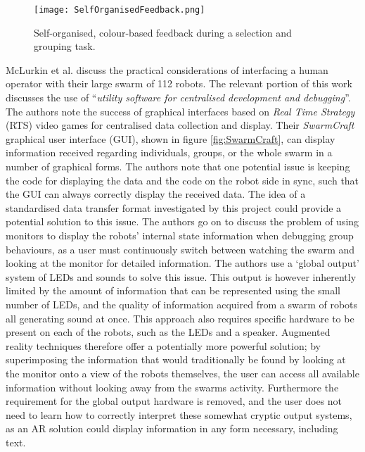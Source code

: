 \begin{figure}
 \begin{center}
 \texttt{[image: SelfOrganisedFeedback.png]}
 \decoRule
 \caption[Self Organised Feedback. \cite{Podevijn:2012}]{Self-organised, colour-based feedback during a selection and grouping task. \cite{Podevijn:2012}}
 \label{fig:SelfOrganisedFeedback}
 \end{center}
\end{figure}

McLurkin et al. \cite{McLurkin:2006} discuss the practical considerations of interfacing a human operator with their large swarm of 112 robots. The relevant portion of this work discusses the use of ``\textit{utility software for centralised development and debugging}''. The authors note the success of graphical interfaces based on \textit{Real Time Strategy} (RTS) video games for centralised data collection and display. Their \textit{SwarmCraft} graphical user interface (GUI), shown in figure \ref{fig:SwarmCraft}, can display information received regarding individuals, groups, or the whole swarm in a number of graphical forms. The authors note that one potential issue is keeping the code for displaying the data and the code on the robot side in sync, such that the GUI can always correctly display the received data. The idea of a standardised data transfer format investigated by this project could provide a potential solution to this issue. The authors go on to discuss the problem of using monitors to display the robots' internal state information when debugging group behaviours, as a user must continuously switch between watching the swarm and looking at the monitor for detailed information. The authors use a `global output' system of LEDs and sounds to solve this issue. This output is however inherently limited by the amount of information that can be represented using the small number of LEDs, and the quality of information acquired from a swarm of robots all generating sound at once. This approach also requires specific hardware to be present on each of the robots, such as the LEDs and a speaker. Augmented reality techniques therefore offer a potentially more powerful solution; by superimposing the information that would traditionally be found by looking at the monitor onto a view of the robots themselves, the user can access all available information without looking away from the swarms activity. Furthermore the requirement for the global output hardware is removed, and the user does not need to learn how to correctly interpret these somewhat cryptic output systems, as an AR solution could display information in any form necessary, including text.

